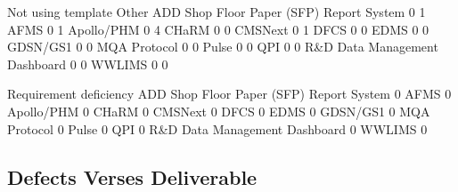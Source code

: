 \documentclass{article}
\begin{document}
\begin{Schunk}
\begin{Soutput}
                                           Not using template Other
  ADD Shop Floor Paper (SFP) Report System                  0     1
  AFMS                                                      0     1
  Apollo/PHM                                                0     4
  CHaRM                                                     0     0
  CMSNext                                                   0     1
  DFCS                                                      0     0
  EDMS                                                      0     0
  GDSN/GS1                                                  0     0
  MQA Protocol                                              0     0
  Pulse                                                     0     0
  QPI                                                       0     0
  R&D Data Management Dashboard                             0     0
  WWLIMS                                                    0     0
                                          
                                           Requirement deficiency
  ADD Shop Floor Paper (SFP) Report System                      0
  AFMS                                                          0
  Apollo/PHM                                                    0
  CHaRM                                                         0
  CMSNext                                                       0
  DFCS                                                          0
  EDMS                                                          0
  GDSN/GS1                                                      0
  MQA Protocol                                                  0
  Pulse                                                         0
  QPI                                                           0
  R&D Data Management Dashboard                                 0
  WWLIMS                                                        0
\end{Soutput}
\end{Schunk}

\subsection{Defects Verses Deliverable}
\end{document}
